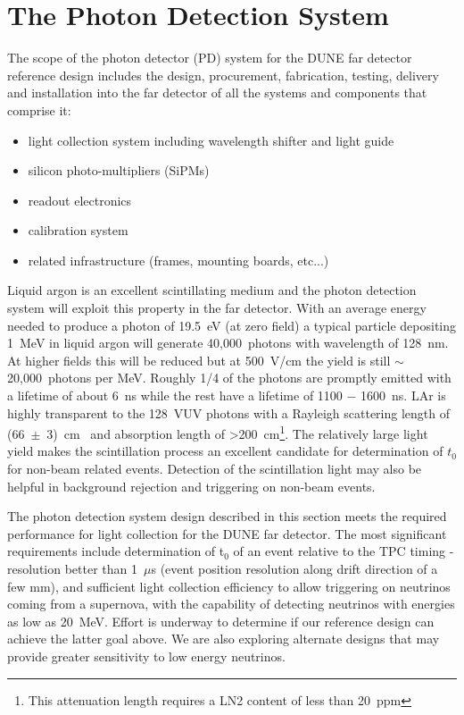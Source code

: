 \section{The Photon Detection System}
\label{sec:detectors-fd-ref-pd}

The scope of the photon detector (PD) system for the DUNE far detector
reference design includes the design, procurement, fabrication,
testing, delivery and installation into the far detector of all the
systems and components that comprise it:

\begin{itemize}
\item light collection system including wavelength shifter and light guide
\item silicon photo-multipliers (SiPMs)
\item readout electronics
\item calibration system
\item related infrastructure (frames, mounting boards, etc...)
\end{itemize}

Liquid argon is an excellent scintillating medium and the photon
detection system will exploit this property in the far detector.  With
an average energy needed to produce a photon of 19.5~eV (at zero
field) a typical particle depositing 1~MeV in liquid argon will
generate 40,000~photons with wavelength of 128~nm. At higher fields
this will be reduced but at 500~V/cm the yield is still
$\sim$20,000~photons per MeV. Roughly 1/4 of the photons are promptly
emitted with a lifetime of about 6~ns while the rest have a lifetime
of 1100 $-$ 1600~ns. LAr is highly transparent to the 128~VUV photons
with a Rayleigh scattering length of (66~$\pm$~3)~cm~\cite{Rayleigh}
and absorption length of >200~cm\footnote{This attenuation length
  requires a LN2 content of less than 20~ppm}. The relatively large light yield
makes the scintillation process an excellent candidate for
determination of $t_{0}$ for non-beam related events. Detection of the
scintillation light may also be helpful in background rejection and
triggering on non-beam events.

The photon detection system design described in this section meets the
required performance for light collection for the DUNE far
detector. The most significant requirements include determination of
t$_0$ of an event relative to the TPC timing - resolution better than
1~$\mu$s (event position resolution along drift direction of a few
mm), and sufficient light collection efficiency to allow triggering on
neutrinos coming from a supernova, with the capability of detecting
neutrinos with energies as low as 20~MeV. Effort is underway to
determine if our reference design can achieve the latter goal
above. We are also exploring alternate designs that may provide
greater sensitivity to low energy neutrinos.

